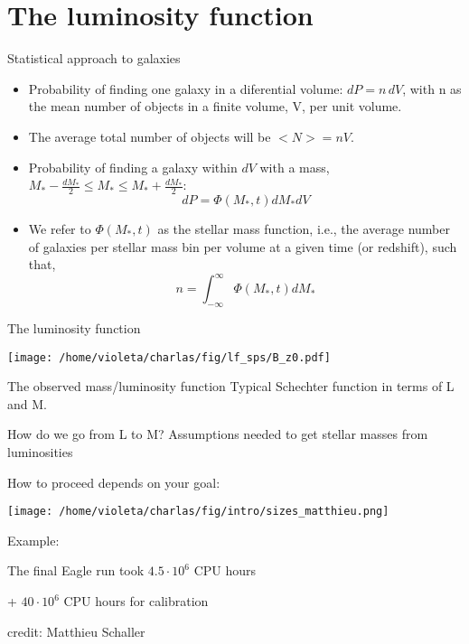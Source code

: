 \documentclass{beamer}
\begin{document}
\section{The luminosity function}
\begin{frame}{Statistical approach to galaxies}
\begin{itemize}
\item Probability of finding one galaxy in a diferential volume: $dP=n\,dV$, with n as the mean number of objects in a finite volume, V, per unit volume.
\item The average total number of objects will be $<N>=nV$.
\item Probability of finding a galaxy within $dV$ with a mass, $M_*-\frac{dM_*}{2}\le M_* \le M_*+\frac{dM_*}{2}$: \begin{equation*} dP = \Phi(M_*,t)dM_*dV \end{equation*}
\item We refer to $\Phi(M_*,t)$ as the stellar mass function, i.e., the average number of galaxies per stellar mass bin per volume at a given time (or redshift), such that, \begin{equation*} n = \int_{-\infty}^{\infty}\Phi(M_*,t)dM_* \end{equation*}
\end{itemize}
\end{frame}

\begin{frame}{The luminosity function}
\begin{center}
\texttt{[image: /home/violeta/charlas/fig/lf\_sps/B\_z0.pdf]}
\end{center}
\end{frame}


\begin{frame}{The observed mass/luminosity function}
Typical Schechter function in terms of L and M.

How do we go from L to M? Assumptions needed to get stellar masses from luminosities
\end{frame}



\begin{frame}{How to proceed depends on your goal:}
\begin{flushleft}
\texttt{[image: /home/violeta/charlas/fig/intro/sizes\_matthieu.png]}
\end{flushleft}

\vspace{1cm}Example: 

The final Eagle run took $4.5\cdot 10^{6}$ CPU hours 

+ $40\cdot 10^{6}$ CPU hours for calibration

\begin{center}
{\tiny {\sc credit:} Matthieu Schaller}
\end{center}
\end{frame}
\end{document}
